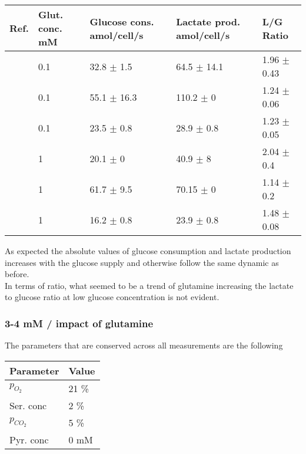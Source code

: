 \documentclass[11pt,a4paper]{article}
\begin{document}
\begin{table}[h!]
\begin{center}
\begin{tabular}{ |p{7mm}|p{12mm}|p{21mm}|p{23mm}|p{25mm}| }
 \hline
 \textbf{Ref.} & \textbf{Glut. conc.}  mM & \textbf{Glucose cons.} amol/cell/s & \textbf{Lactate prod.} amol/cell/s& \textbf{L/G Ratio} \\
 \hline
    \cite{Grashei2022} & 0.1 &  32.8 $\pm$  1.5  & 64.5  $\pm$  14.1  & 1.96  $\pm$ 0.43  \\
    \hline
   \cite{Gkiouli2019} & 0.1 &  55.1 $\pm$  16.3  & 110.2  $\pm$  0  & 1.24  $\pm$ 0.06  \\
    \hline
   \cite{Otto2015} & 0.1 & 23.5 $\pm$  0.8  & 28.9 $\pm$  0.8 & 1.23 $\pm$  0.05 \\
   \hline
    \cite{Grashei2022} & 1 &  20.1 $\pm$  0  & 40.9  $\pm$  8  & 2.04  $\pm$ 0.4  \\
    \hline
  \cite{Gkiouli2019} & 1 &   61.7  $\pm$ 9.5 &  70.15 $\pm$  0   & 1.14 $\pm$  0.2 \\
   \hline
  \cite{Otto2015} & 1 &   16.2  $\pm$ 0.8 &  23.9 $\pm$  0.8   & 1.48 $\pm$  0.08 \\
   \hline
\end{tabular}
\end{center}
\end{table}

As expected the absolute values of glucose consumption and lactate production increases with the glucose supply and otherwise follow the same dynamic as before.\\

In terms of ratio, what seemed to be a trend of glutamine increasing the lactate to glucose ratio at low glucose concentration is not evident.  

\subsubsection{3-4 mM / impact of glutamine}
The parameters that are conserved across all measurements are the following\\ 

\begin{table}[h!]
\begin{center}
\begin{tabular}{ |p{25mm}|p{25mm}|}
\hline
\textbf{Parameter} & \textbf{Value} \\
\hline
$p_{O_2}$ & 21 \% \\
\hline
Ser. conc & 2 \% \\
\hline
$p_{CO_2}$ & 5 \% \\
\hline
Pyr. conc & 0 mM \\
\hline
\end{tabular}
\end{center}
\end{table}
\end{document}
